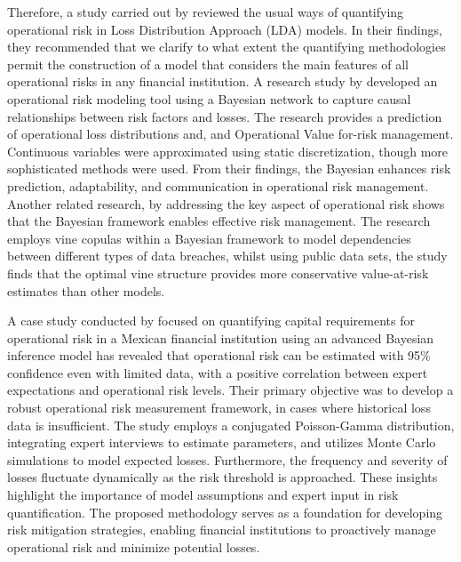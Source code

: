 Therefore, a study carried out by \textcite{tudor_operational_2017} reviewed the usual ways of quantifying operational risk in Loss Distribution Approach (LDA) models. In their findings, they recommended that we clarify to what extent the quantifying methodologies permit the construction of a model that considers the main features of all operational risks in any financial institution.  A research study by \textcite{sanford_operational_2015} developed an operational risk modeling tool using a Bayesian network to capture causal relationships between risk factors and losses. The research provides a prediction of operational loss distributions and, and Operational Value for-risk management. Continuous variables were approximated using static discretization, though more sophisticated methods were used. From their findings, the Bayesian enhances risk prediction, adaptability, and communication in operational risk management. Another related research, by \textcite{liu_bayesian_2022} addressing the key aspect of operational risk shows that the Bayesian framework enables effective risk management. The research employs vine copulas within a Bayesian framework to model dependencies between different types of data breaches, whilst using public data sets, the study finds that the optimal vine structure provides more conservative value-at-risk estimates than other models. 

A case study conducted by \textcite{universidad_panamericana_operational_2017} focused on quantifying capital requirements for operational risk in a Mexican financial institution using an advanced Bayesian inference model has revealed that operational risk can be estimated with 95\% confidence even with limited data, with a positive correlation between expert expectations and operational risk levels. Their primary objective was to develop a robust operational risk measurement framework, in cases where historical loss data is insufficient. The study employs a conjugated Poisson-Gamma distribution, integrating expert interviews to estimate parameters, and utilizes Monte Carlo simulations to model expected losses. Furthermore, the frequency and severity of losses fluctuate dynamically as the risk threshold is approached. These insights highlight the importance of model assumptions and expert input in risk quantification. The proposed methodology serves as a foundation for developing risk mitigation strategies, enabling financial institutions to proactively manage operational risk and minimize potential losses.

